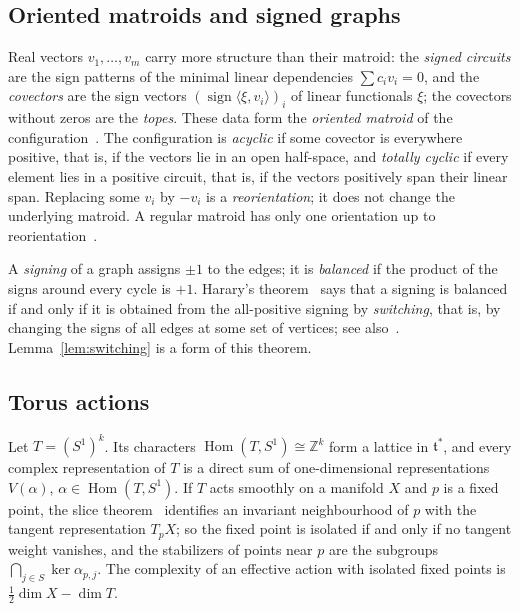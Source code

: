 \documentclass[11pt,a4paper]{article}
\numberwithin{equation}{section}
\theoremstyle{plain}
\theoremstyle{definition}
\theoremstyle{remark}
\newcommand{\Z}{\mathbb{Z}}
\DeclareMathOperator{\Hom}{Hom}
\begin{document}
\subsection{Oriented matroids and signed graphs}\label{app:oriented}
Real vectors $v_1,\dots,v_m$ carry more structure than their matroid: the \emph{signed circuits} are the sign patterns of the minimal linear dependencies $\sum c_iv_i=0$, and the \emph{covectors} are the sign vectors $(\operatorname{sign}\langle\xi,v_i\rangle)_i$ of linear functionals $\xi$; the covectors without zeros are the \emph{topes}. These data form the \emph{oriented matroid} of the configuration~\cite{BLSWZ99}. The configuration is \emph{acyclic} if some covector is everywhere positive, that is, if the vectors lie in an open half-space, and \emph{totally cyclic} if every element lies in a positive circuit, that is, if the vectors positively span their linear span. Replacing some $v_i$ by $-v_i$ is a \emph{reorientation}; it does not change the underlying matroid. A regular matroid has only one orientation up to reorientation~\cite{BLV78}.

A \emph{signing} of a graph assigns $\pm1$ to the edges; it is \emph{balanced} if the product of the signs around every cycle is $+1$. Harary's theorem~\cite{Har53} says that a signing is balanced if and only if it is obtained from the all-positive signing by \emph{switching}, that is, by changing the signs of all edges at some set of vertices; see also~\cite{Zas82}. Lemma~\ref{lem:switching} is a form of this theorem.

\subsection{Torus actions}\label{app:torus}
Let $T=(S^1)^k$. Its characters $\Hom(T,S^1)\cong\Z^k$ form a lattice in $\mathfrak t^*$, and every complex representation of $T$ is a direct sum of one-dimensional representations $V(\alpha)$, $\alpha\in\Hom(T,S^1)$. If $T$ acts smoothly on a manifold $X$ and $p$ is a fixed point, the slice theorem~\cite{Bre72} identifies an invariant neighbourhood of $p$ with the tangent representation $T_pX$; so the fixed point is isolated if and only if no tangent weight vanishes, and the stabilizers of points near $p$ are the subgroups $\bigcap_{j\in S}\ker\alpha_{p,j}$. The complexity of an effective action with isolated fixed points is $\frac12\dim X-\dim T$.
\end{document}
